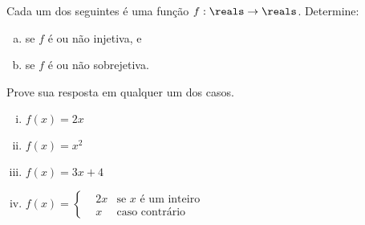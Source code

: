 \begin{exercise}
    Cada um dos seguintes é uma função $f : \reals \to \reals$. Determine:
    \begin{enumerate}[(a)]
        \item se $f$ é ou não injetiva, e
        \item se $f$ é ou não sobrejetiva.
    \end{enumerate}
    Prove sua resposta em qualquer um dos casos.

    \begin{enumerate}[(i)]
        \item $f(x) = 2x$
        \item $f(x) = x^2$
        \item $f(x) = 3x + 4$
        \item $f(x) = \left \{ \begin{aligned}
                        &2x &\text{se $x$ é um inteiro}\\
                        &x  &\text{caso contrário}
                         \end{aligned}
                      \right.$
    \end{enumerate}
\end{exercise}
